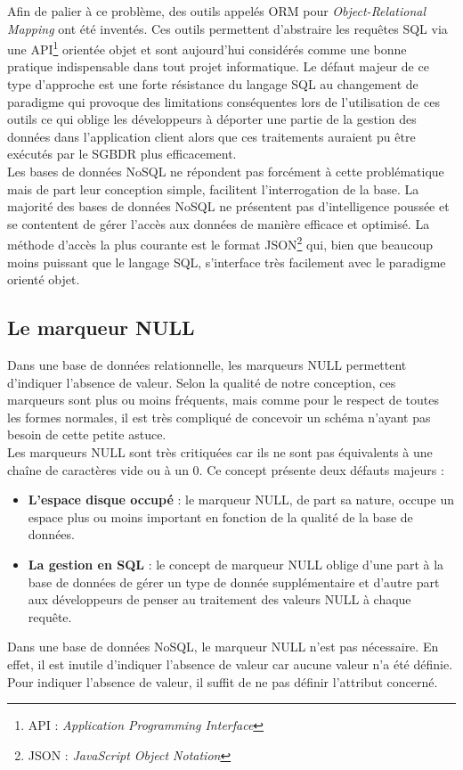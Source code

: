   Afin de palier à ce problème, des outils appelés ORM pour \textit{Object-Relational Mapping} ont été inventés. Ces outils permettent d'abstraire les requêtes SQL via une API\footnote{API : \textit{Application Programming Interface}} orientée objet et sont aujourd'hui considérés comme une bonne pratique indispensable dans tout projet informatique. Le défaut majeur de ce type d'approche est une forte résistance du langage SQL au changement de paradigme qui provoque des limitations conséquentes lors de l'utilisation de ces outils ce qui oblige les développeurs à déporter une partie de la gestion des données dans l'application client alors que ces traitements auraient pu être exécutés par le SGBDR plus efficacement.\\

  Les bases de données NoSQL ne répondent pas forcément à cette problématique mais de part leur conception simple, facilitent l'interrogation de la base. La majorité des bases de données NoSQL ne présentent pas d'intelligence poussée et se contentent de gérer l'accès aux données de manière efficace et optimisé. La méthode d'accès la plus courante est le format JSON\footnote{JSON : \textit{JavaScript Object Notation}} qui, bien que beaucoup moins puissant que le langage SQL, s'interface très facilement avec le paradigme orienté objet.


\subsection{Le marqueur NULL}
  Dans une base de données relationnelle, les marqueurs  NULL permettent d'indiquer l'absence de valeur. Selon la qualité de notre conception, ces marqueurs sont plus ou moins fréquents, mais comme pour le respect de toutes les formes normales, il est très compliqué de concevoir un schéma n'ayant pas besoin de cette petite astuce.\\

  Les marqueurs NULL sont très critiquées car ils ne sont pas équivalents à une chaîne de caractères vide ou à un 0. Ce concept présente deux défauts majeurs :
  \vspace{10px}
  \begin{itemize}
    \item \textbf{L'espace disque occupé} : le marqueur NULL, de part sa nature, occupe un espace plus ou moins important en fonction de la qualité de la base de données.
    \item \textbf{La gestion en SQL} : le concept de marqueur NULL oblige d'une part à la base de données de gérer un type de donnée supplémentaire et d'autre part aux développeurs de penser au traitement des valeurs NULL à chaque requête.
  \end{itemize}
  \vspace{20px}

  Dans une base de données NoSQL, le marqueur NULL n'est pas nécessaire. En effet, il est inutile d'indiquer l'absence de valeur car aucune valeur n'a été définie. Pour indiquer l'absence de valeur, il suffit de ne pas définir l'attribut concerné.
